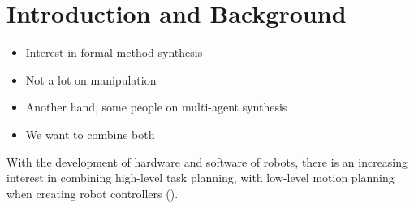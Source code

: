 \section{Introduction and Background}
\begin{itemize}
\item Interest in formal method synthesis
\item Not a lot on manipulation
\item Another hand, some people on multi-agent synthesis
\item We want to combine both
\end{itemize}

With the development of hardware and software of robots,
there is an increasing interest in combining high-level task planning,
with low-level motion planning when creating robot controllers ().
